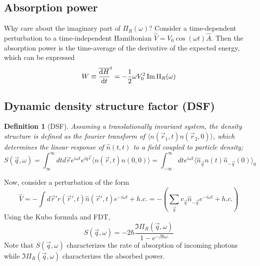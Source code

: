 \documentclass[10pt]{article}
\newtheorem*{defn}{Definition}
\begin{document}
\subsection{Absorption power}
Why care about the imaginary part of $\Pi_R(\omega)$? Consider a time-dependent perturbation to a time-independent Hamiltonian $\hat V = V_0 \cos(\omega t)\hat A$. Then the absorption power is the time-average of the derivative of the expected energy, which can be expressed
$$
W \equiv \overline{\dv{H}{t}}^t = -\frac{1}{2}\omega V_{0}^2 \Im \Pi_R(\omega)
$$

\subsection{Dynamic density structure factor (DSF)}
\begin{defn}[DSF]
Assuming a translationally invariant system, the density structure is defined as the fourier transform of $\langle n(\vec r_1, t) n(\vec r_2, 0) \rangle$, which determines the linear response of $\hat n(t, t)$ to a field coupled to particle density;
$$
S(\vec q, \omega) = \int_{\infty}^\infty dt d\vec r e^{i\omega t}e^{iq\vec r} \langle n(\vec r, t)n(0, 0)\rangle = \int_{-\infty}^\infty dt e^{i\omega t}\langle \hat n_{\vec q}n(t)\hat n_{-\vec q}(0)\rangle_0
$$
\end{defn}
Now, consider a perturbation of the form
$$
\hat V = -\int d\vec r' r(\vec r', t) \hat n(\vec r', t) e^{-i\omega t} + h.c. = -(\sum_{\vec q}v_{\vec q}\hat n_{-\vec q}e^{-i\omega t} + h.c.)
$$
Using the Kubo formula and FDT,
$$
S(\vec q, \omega) = -2\hbar \frac{\Im \Pi_R(\vec q, \omega)}{1-e^{-\beta \hbar \omega}}
$$
Note that $S(\vec q, \omega)$ characterizes the rate of absorption of incoming photons while $\Im \Pi_R(\vec q, \omega)$ characterizes the absorbed power.
\end{document}
